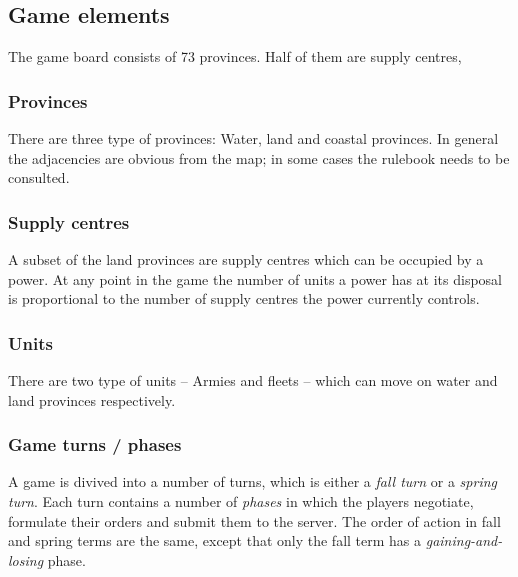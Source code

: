 \documentclass[pdftex,12pt,a4paper]{report}
\begin{document}
\subsection{Game elements}

The game board consists of 73 provinces. Half of them are supply centres, 

\subsubsection{Provinces}

There are three type of provinces: Water, land and coastal 
provinces. In general the adjacencies are obvious from the map; 
in some cases the rulebook needs to be consulted.

\subsubsection{Supply centres}

A subset of the land provinces are supply centres which can be 
occupied by a power. At any point in the game the number of units
a power has at its disposal is proportional to the number of 
supply centres the power currently controls.

\subsubsection{Units}

There are two type of units -- Armies and fleets -- which can move on 
water and land provinces respectively.

\subsubsection{Game turns / phases}

A game is divived into a number of turns, which is either a
\textit{fall turn} or a \textit{spring turn}. Each turn contains a
number of \textit{phases} in which the players negotiate, formulate
their orders and submit them to the server. The order of action in
fall and spring terms are the same, except that only the fall term
has a \textit{gaining-and-losing} phase.
\end{document}
